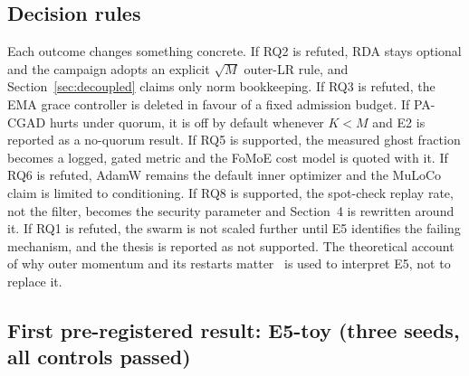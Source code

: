 \documentclass[11pt,a4paper]{article}
\begin{document}
\subsection{Decision rules}

Each outcome changes something concrete. If RQ2 is refuted, RDA stays optional and the campaign adopts an explicit $\sqrt{M}$ outer-LR rule, and Section~\ref{sec:decoupled} claims only norm bookkeeping. If RQ3 is refuted, the EMA grace controller is deleted in favour of a fixed admission budget. If PA-CGAD hurts under quorum, it is off by default whenever $K<M$ and E2 is reported as a no-quorum result. If RQ5 is supported, the measured ghost fraction becomes a logged, gated metric and the FoMoE cost model is quoted with it. If RQ6 is refuted, AdamW remains the default inner optimizer and the MuLoCo claim is limited to conditioning. If RQ8 is supported, the spot-check replay rate, not the filter, becomes the security parameter and Section~4 is rewritten around it. If RQ1 is refuted, the swarm is not scaled further until E5 identifies the failing mechanism, and the thesis is reported as not supported. The theoretical account of why outer momentum and its restarts matter~\cite{agarwala2026twophase,topollai2026restart} is used to interpret E5, not to replace it.


\subsection{First pre-registered result: E5-toy (three seeds, all controls passed)}
\label{sec:e5toy}
\end{document}
